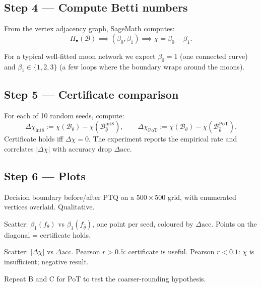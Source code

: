 \documentclass[11pt]{article}
\begin{document}
\subsection{Step 4 — Compute Betti numbers}

From the vertex adjacency graph, SageMath computes:
\begin{equation}
H_\bullet(\mathcal{B}) \implies (\beta_0, \beta_1) \implies
\chi = \beta_0 - \beta_1.
\end{equation}

For a typical well-fitted moon network we expect $\beta_0 = 1$ (one connected curve)
and $\beta_1 \in \{1, 2, 3\}$ (a few loops where the boundary wraps around the moons).

\subsection{Step 5 — Certificate comparison}

For each of 10 random seeds, compute:
\begin{equation}
\Delta\chi_{\mathrm{int8}} := \chi(\mathcal{B}_\theta) - \chi(\mathcal{B}_{\hat\theta}^{\mathrm{int8}}),
\qquad
\Delta\chi_{\mathrm{PoT}} := \chi(\mathcal{B}_\theta) - \chi(\mathcal{B}_{\hat\theta}^{\mathrm{PoT}}).
\end{equation}
Certificate holds iff $\Delta\chi = 0$. The experiment reports the empirical rate
and correlates $|\Delta\chi|$ with accuracy drop $\Delta\mathrm{acc}$.

\subsection{Step 6 — Plots}

\begin{description}[leftmargin=1.5em]
\item[Plot A.] Decision boundary before/after PTQ on a $500 \times 500$ grid,
  with enumerated vertices overlaid. Qualitative.

\item[Plot B.] Scatter: $\beta_1(f_\theta)$ vs $\beta_1(f_{\hat\theta})$, one point
  per seed, coloured by $\Delta\mathrm{acc}$. Points on the diagonal = certificate
  holds.

\item[Plot C.] Scatter: $|\Delta\chi|$ vs $\Delta\mathrm{acc}$.
  Pearson $r > 0.5$: certificate is useful.
  Pearson $r < 0.1$: $\chi$ is insufficient; negative result.

\item[Plot D.] Repeat B and C for PoT to test the coarser-rounding hypothesis.
\end{description}
\end{document}
